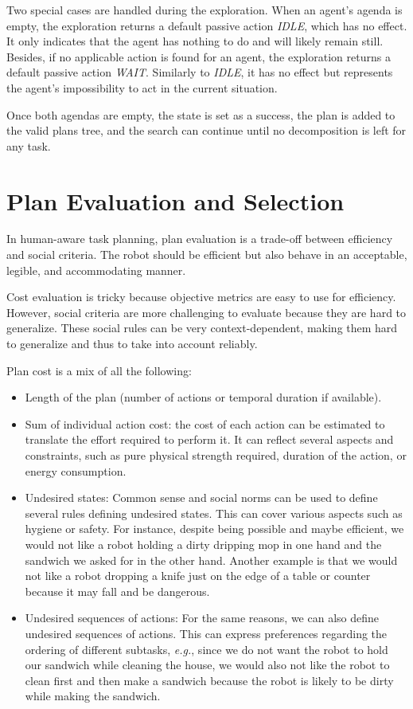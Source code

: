 Two special cases are handled during the exploration. 
When an agent's agenda is empty, the exploration returns a default passive action \textit{IDLE}, which has no effect. It only indicates that the agent has nothing to do and will likely remain still. 
Besides, if no applicable action is found for an agent, the exploration returns a default passive action \textit{WAIT}. Similarly to \textit{IDLE}, it has no effect but represents the agent's impossibility to act in the current situation. 

Once both agendas are empty, the state is set as a success, the plan is added to the valid plans tree, and the search can continue until no decomposition is left for any task.


\section{Plan Evaluation and Selection}

In human-aware task planning, plan evaluation is a trade-off between efficiency and social criteria.
The robot should be efficient but also behave in an acceptable, legible, and accommodating manner.  


Cost evaluation is tricky because objective metrics are easy to use for efficiency. However, social criteria are more challenging to evaluate because they are hard to generalize. These social rules can be very context-dependent, making them hard to generalize and thus to take into account reliably.

Plan cost is a mix of all the following:

\begin{itemize}
    \item Length of the plan (number of actions or temporal duration if available).
    \item Sum of individual action cost: the cost of each action can be estimated to translate the effort required to perform it. It can reflect several aspects and constraints, such as pure physical strength required, duration of the action, or energy consumption.
    \item Undesired states: Common sense and social norms can be used to define several rules defining undesired states. This can cover various aspects such as hygiene or safety. For instance, despite being possible and maybe efficient, we would not like a robot holding a dirty dripping mop in one hand and the sandwich we asked for in the other hand. Another example is that we would not like a robot dropping a knife just on the edge of a table or counter because it may fall and be dangerous. 
    \item Undesired sequences of actions: For the same reasons, we can also define undesired sequences of actions. This can express preferences regarding the ordering of different subtasks, \textit{e.g.}, since we do not want the robot to hold our sandwich while cleaning the house, we would also not like the robot to clean first and then make a sandwich because the robot is likely to be dirty while making the sandwich.  
\end{itemize}


